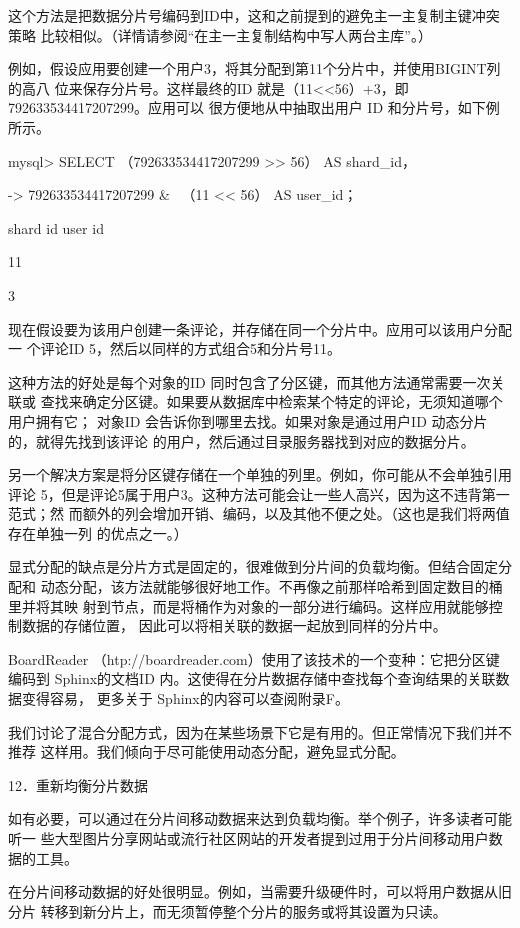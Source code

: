这个方法是把数据分片号编码到ID中，这和之前提到的避免主一主复制主键冲突策略
比较相似。（详情请参阅“在主一主复制结构中写人两台主库”。）

例如，假设应用要创建一个用户3，将其分配到第11个分片中，并使用BIGINT列的高八
位来保存分片号。这样最终的ID 就是（11<<56）+3，即 792633534417207299。应用可以
很方便地从中抽取出用户 ID 和分片号，如下例所示。

mysql> SELECT （792633534417207299 >> 56） AS shard\_id，

-> 792633534417207299 & ~（11 << 56） AS user\_id；

shard id user id

11

3

现在假设要为该用户创建一条评论，并存储在同一个分片中。应用可以该用户分配一
个评论ID 5，然后以同样的方式组合5和分片号11。

这种方法的好处是每个对象的ID 同时包含了分区键，而其他方法通常需要一次关联或
查找来确定分区键。如果要从数据库中检索某个特定的评论，无须知道哪个用户拥有它；
对象ID 会告诉你到哪里去找。如果对象是通过用户ID 动态分片的，就得先找到该评论
的用户，然后通过目录服务器找到对应的数据分片。

另一个解决方案是将分区键存储在一个单独的列里。例如，你可能从不会单独引用评论
5，但是评论5属于用户3。这种方法可能会让一些人高兴，因为这不违背第一范式；然
而额外的列会增加开销、编码，以及其他不便之处。（这也是我们将两值存在单独一列
的优点之一。）

显式分配的缺点是分片方式是固定的，很难做到分片间的负载均衡。但结合固定分配和
动态分配，该方法就能够很好地工作。不再像之前那样哈希到固定数目的桶里并将其映
射到节点，而是将桶作为对象的一部分进行编码。这样应用就能够控制数据的存储位置，
因此可以将相关联的数据一起放到同样的分片中。

BoardReader （htp://boardreader.com）使用了该技术的一个变种：它把分区键编码到
Sphinx的文档ID 内。这使得在分片数据存储中查找每个查询结果的关联数据变得容易，
更多关于 Sphinx的内容可以查阅附录F。

我们讨论了混合分配方式，因为在某些场景下它是有用的。但正常情况下我们并不推荐
这样用。我们倾向于尽可能使用动态分配，避免显式分配。

12．重新均衡分片数据

如有必要，可以通过在分片间移动数据来达到负载均衡。举个例子，许多读者可能听一
些大型图片分享网站或流行社区网站的开发者提到过用于分片间移动用户数据的工具。

在分片间移动数据的好处很明显。例如，当需要升级硬件时，可以将用户数据从旧分片
转移到新分片上，而无须暂停整个分片的服务或将其设置为只读。

